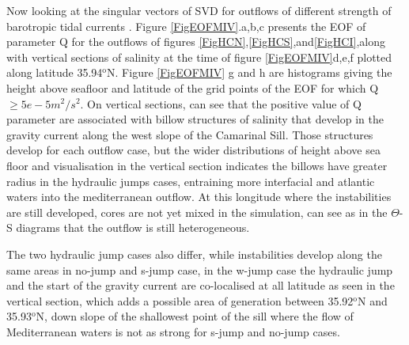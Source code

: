 Now looking at the singular vectors of SVD for outflows of different strength of barotropic tidal currents . Figure \ref{FigEOFMIV}.a,b,c presents the EOF of parameter Q for the outflows of figures \ref{FigHCN},\ref{FigHCS},and\ref{FigHCI},along with vertical sections of salinity at the time of figure \ref{FigEOFMIV}d,e,f plotted along latitude 35.94$^\text{o}$N. Figure \ref{FigEOFMIV} g and h are histograms giving the height above seafloor and latitude of the grid points of the EOF for which Q$\geq 5e-5m^2/s^2$. On vertical sections, can see that the positive value of Q parameter are associated with billow structures of salinity that develop in the gravity current along the west slope of the Camarinal Sill. Those structures develop for each outflow case, but the wider distributions of height above sea floor and visualisation in the vertical section indicates the billows have greater radius in the hydraulic jumps cases, entraining more interfacial and atlantic waters into the mediterranean outflow. At this longitude where the instabilities are still developed, cores are not yet mixed in the simulation, can see as in the $\Theta$-S diagrams that the outflow is still heterogeneous.

The two hydraulic jump cases also differ, while instabilities develop along the same areas in no-jump and s-jump case, in the w-jump case the hydraulic jump and the start of the gravity current are co-localised at all latitude as seen in the vertical section, which adds a possible area of generation between 35.92$^\text{o}$N and 35.93$^\text{o}$N, down slope of the shallowest point of the sill where the flow of Mediterranean waters is not as strong for s-jump and no-jump cases.


